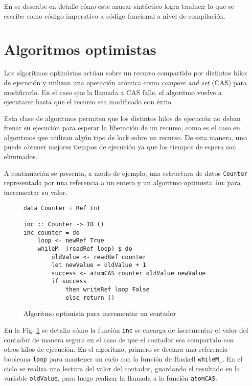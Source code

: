 En \cite{do-notation} se describe en detalle cómo este azucar sintáctico logra traducir lo que se escribe como código imperativo a código funcional a nivel de compilación.

\section{Algoritmos optimistas}\label{sec:lockfree}
Los algoritmos optimistas actúan sobre un recurso compartido por distintos hilos de ejecución y utilizan una operación atómica como \emph{compare and set} (CAS) para modificarlo.
En el caso que la llamada a CAS falle, el algoritmo vuelve a ejecutarse hasta que el recurso sea modificado con éxito.

Esta clase de algoritmos permiten que los distintos hilos de ejecución no deban frenar su ejecución para esperar la liberación de un recurso, como es el caso en algoritmos que utilizan algún tipo de lock sobre un recurso.
De esta manera, uno puede obtener mejores tiempos de ejecución ya que los tiempos de espera son eliminados.

A continuación se presenta, a modo de ejemplo, una estructura de datos \texttt{Counter} representada por una referencia a un entero y un algoritmo optimista \texttt{inc} para incrementar su valor.

\begin{figure}[H]
\begin{verbatim}
data Counter = Ref Int

inc :: Counter -> IO ()
inc counter = do
    loop <- newRef True
    whileM_ (readRef loop) $ do
        oldValue <- readRef counter
        let newValue = oldValue + 1
        success <- atomCAS counter oldValue newValue
        if success
            then writeRef loop False
            else return ()
\end{verbatim}
\caption{Algoritmo optimista para incrementar un contador}
\label{fig:lockfree-counter-example}
\end{figure}

En la Fig. \ref{fig:lockfree-counter-example} se detalla cómo la función \texttt{inc} se encarga de incrementar el valor del contador de manera segura en el caso de que el contador sea compartido con otros hilos de ejecución.
En el algoritmo, primero se declara una referencia booleana \texttt{loop} para mantener un ciclo con la función de Haskell \texttt{whileM\_}.
En el ciclo se realiza una lectura del valor del contador, guardando el resultado en la variable \texttt{oldValue}, para luego realizar la llamada a la función \texttt{atomCAS}.

